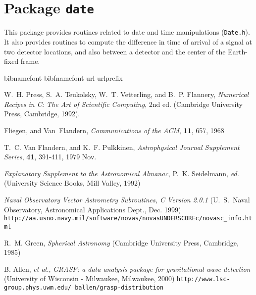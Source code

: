
\chapter{Package \texttt{date}}

This package provides routines related to date and time manipulations
(\texttt{Date.h}).  It also provides routines to compute the
difference in time of arrival of a signal at two detector locations,
and also between a detector and the center of the Earth-fixed frame.

\newpage

\newpage\begin{thebibliography}{1}
\expandafter\ifx\csname bibnamefont\endcsname\relax
  \def\bibnamefont#1{#1}\fi
\expandafter\ifx\csname bibfnamefont\endcsname\relax
  \def\bibfnamefont#1{#1}\fi
\expandafter\ifx\csname url\endcsname\relax
  \def\url#1{\texttt{#1}}\fi
\expandafter\ifx\csname urlprefix\endcsname\relax\def\urlprefix{URL }\fi
\providecommand{\bibinfo}[2]{#2}
\providecommand{\eprint}[2][]{\url{#2}}

  W.~H. Press, S.~A. Teukolsky, W.~T. Vetterling, and B.~P. Flannery,
  \textit{Numerical Recipes in C: The Art of Scientific Computing}, 2nd ed.
  (Cambridge University Press, Cambridge, 1992).

  Fliegen, and Van~Flandern, \textit{Communications of the ACM}, \textbf{11},
  657, 1968

  T.~C. Van Flandern, and K.~F. Pulkkinen,
  \textit{Astrophysical Journal Supplement Series}, \textbf{41},
  391-411, 1979 Nov.

 \textit{Explanatory Supplement to the Astronomical
  Almanac}, P.~K. Seidelmann, \textit{ed.} (University Science Books,
  Mill Valley, 1992)

  \textit{Naval Observatory Vector Astrometry Subroutines, C Version 2.0.1}
  (U.~S.~Naval Observatory, Astronomical Applications Dept., Dec. 1999)
  \url{http://aa.usno.navy.mil/software/novas/novasUNDERSCOREc/novasc_info.html}

  R.~M. Green, \textit{Spherical Astronomy} (Cambridge University Press,
  Cambridge, 1985)

  B. Allen, \textit{et al.}, \textit{GRASP: a data analysis package
    for gravitational wave detection} (University of Wisconsin
  - Milwaukee, Milwaukee, 2000)
  \url{http://www.lsc-group.phys.uwm.edu/~ballen/grasp-distribution}


\end{thebibliography}
